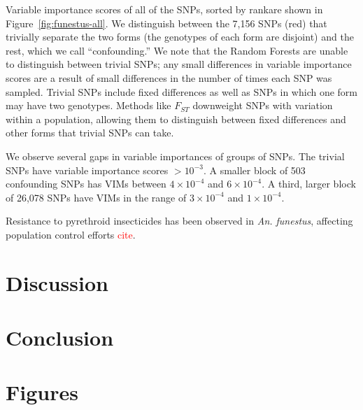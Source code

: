 Variable importance scores of all of the SNPs, sorted by rankare shown in Figure~\ref{fig:funestus-all}.  We distinguish between the 7,156 SNPs (red) that trivially separate the two forms (the genotypes of each form are disjoint) and the rest, which we call ``confounding.''  We note that the Random Forests are unable to distinguish between trivial SNPs; any small differences in variable importance scores are a result of small differences in the number of times each SNP was sampled.  Trivial SNPs include fixed differences as well as SNPs in which one form may have two genotypes.  Methods like $F_{ST}$ downweight SNPs with variation within a population, allowing them to distinguish between fixed differences and other forms that trivial SNPs can take.

We observe several gaps in variable importances of groups of SNPs.  The trivial SNPs have variable importance scores $> 10^{-3}$.  A smaller block of 503 confounding SNPs has VIMs between $4\times 10^{-4}$ and $6\times 10^{-4}$.  A third, larger block of 26,078 SNPs have VIMs in the range of $3\times 10^{-4}$ and $1\times 10^{-4}$.  




Resistance to pyrethroid insecticides has been observed in \emph{An. funestus}, affecting population control efforts \textcolor{red}{cite}.   

\section{Discussion}

\section{Conclusion}

\section{Figures}

\pagebreak

